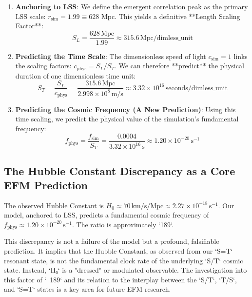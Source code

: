 \documentclass[11pt]{article}
\begin{document}
\begin{enumerate}
    \item \textbf{Anchoring to LSS}: We define the emergent correlation peak as the primary LSS scale: \(r_{\text{sim}} = 1.99 \equiv 628\) Mpc. This yields a definitive **Length Scaling Factor**:
    \begin{equation}
    S_L = \frac{628 \, \text{Mpc}}{1.99} \approx 315.6 \, \text{Mpc}/\text{dimless\_unit}
    \end{equation}
    
    \item \textbf{Predicting the Time Scale}: The dimensionless speed of light \(c_{\text{sim}}=1\) links the scaling factors: \(c_{\text{phys}} = S_L / S_T\). We can therefore **predict** the physical duration of one dimensionless time unit:
    \begin{equation}
    S_T = \frac{S_L}{c_{\text{phys}}} = \frac{315.6 \, \text{Mpc}}{2.998 \times 10^8 \, \text{m/s}} \approx 3.32 \times 10^{16} \, \text{seconds/dimless\_unit}
    \end{equation}
    
    \item \textbf{Predicting the Cosmic Frequency (A New Prediction)}: Using this time scaling, we predict the physical value of the simulation's fundamental frequency:
    \begin{equation}
    f_{\text{phys}} = \frac{f_{\text{sim}}}{S_T} = \frac{0.0004}{3.32 \times 10^{16} \, \text{s}} \approx 1.20 \times 10^{-20} \, \text{s}^{-1}
    \end{equation}
\end{enumerate}

\subsection{The Hubble Constant Discrepancy as a Core EFM Prediction}
The observed Hubble Constant is \(H_0 \approx 70 \, \text{km/s/Mpc} \approx 2.27 \times 10^{-18} \, \text{s}^{-1}\). Our model, anchored to LSS, predicts a fundamental cosmic frequency of \(f_{\text{phys}} \approx 1.20 \times 10^{-20} \, \text{s}^{-1}\). The ratio is approximately `189`.

This discrepancy is not a failure of the model but a profound, falsifiable prediction. It implies that the Hubble Constant, as observed from our `S=T` resonant state, is not the fundamental clock rate of the underlying `S/T` cosmic state. Instead, `H₀` is a "dressed" or modulated observable. The investigation into this factor of `~189` and its relation to the interplay between the `S/T`, `T/S`, and `S=T` states is a key area for future EFM research.
\end{document}
